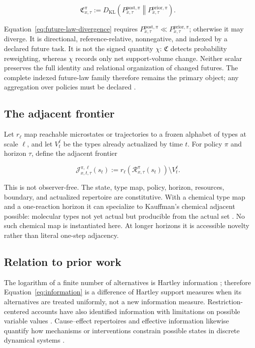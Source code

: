 \begin{equation}
\mathfrak{C}_{x,\tau}^{\pi}
:=
D_{\mathrm{KL}}\!\left(
P_{x,\tau}^{\mathrm{post},\pi}
\middle\|
P_{x,\tau}^{\mathrm{prior},\pi}
\right).
\label{eq:future-law-divergence}
\end{equation}

Equation~\ref{eq:future-law-divergence} requires
$P_{x,\tau}^{\mathrm{post},\pi}\ll
P_{x,\tau}^{\mathrm{prior},\pi}$; otherwise it may diverge. It is directional,
reference-relative, nonnegative, and indexed by a declared future task. It is
not the signed quantity $\chi$: $\mathfrak C$ detects probability reweighting,
whereas $\chi$ records only net support-volume change. Neither scalar preserves
the full identity and relational organization of changed futures. The complete
indexed future-law family therefore remains the primary object; any aggregation
over policies must be declared \cite{kullback1951information}.

\subsection{The adjacent frontier}

Let $r_\ell$ map reachable microstates or trajectories to a frozen alphabet of
types at scale $\ell$, and let $V_t^\ell$ be the types already actualized by
time $t$. For policy $\pi$ and horizon $\tau$, define the adjacent frontier

\begin{equation}
\mathcal{J}_{x,t,\tau}^{\pi,\ell}(s_t)
:=
r_\ell\!\left(\mathcal{R}_{x,\tau}^{\pi}(s_t)\right)
\setminus V_t^\ell.
\label{eq:adjacent-frontier}
\end{equation}

This is not observer-free. The state, type map, policy, horizon, resources,
boundary, and actualized repertoire are constitutive. With a chemical type map
and a one-reaction horizon it can specialize to Kauffman's chemical adjacent
possible: molecular types not yet actual but producible from the actual set
\cite{kauffman2000investigations}. No such chemical map is instantiated here.
At longer horizons it is accessible novelty rather than literal one-step
adjacency.

\subsection{Relation to prior work}

The logarithm of a finite number of alternatives is Hartley information
\cite{hartley1928transmission}; therefore Equation~\ref{eq:information} is a
difference of Hartley support measures when its alternatives are treated
uniformly, not a new information measure. Restriction-centered accounts have
also identified information with limitations on possible variable values
\cite{zadeh2015information}. Cause--effect repertoires and effective information
likewise quantify how mechanisms or interventions constrain possible states in
discrete dynamical systems \cite{balduzzi2008integrated,hoel2013causal}.

